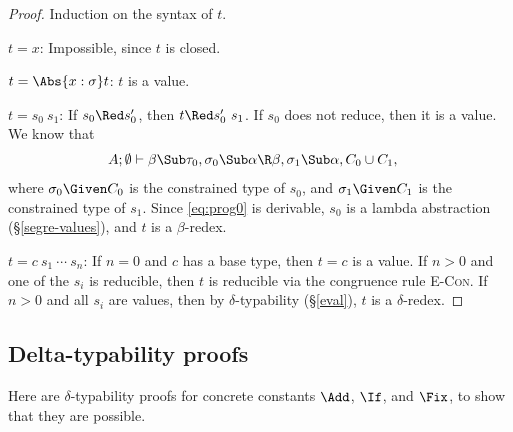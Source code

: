 \documentclass{amsart}
\theoremstyle{definition}
\begin{document}
\begin{proof}
Induction on the syntax of $t$.

\Case$t=x$: Impossible, since $t$ is closed.

\Case$t=\Abs{x:\sigma}t$: $t$ is a value.

\Case$t=s_0~s_1$: If $s_0\Red s_0'$, then $t\Red s_0'~s_1$. If
$s_0$ does not reduce, then it is a value. We know that
\begin{align}
A;\emptyset&\vdash \beta\Sub\tau_0,
\sigma_0\Sub\alpha\R\beta,\sigma_1\Sub\alpha,C_0\cup C_1,
\label{eq:prog0}
\end{align}
where $\sigma_0\Given C_0$ is the constrained type of $s_0$, and
$\sigma_1\Given C_1$ is the constrained type of $s_1$. Since
\eqref{eq:prog0} is derivable, $s_0$ is a lambda abstraction
(\S\ref{segre-values}), and $t$ is a $\beta$-redex.

\Case$t=c~s_1~\cdots~s_n$: If $n=0$ and $c$ has a base type, then
$t=c$ is a value. If $n>0$ and one of the $s_i$ is reducible,
then $t$ is reducible via the congruence rule \textsc{E-Con}. If
$n>0$ and all $s_i$ are values, then by $\delta$-typability
(\S\ref{eval}), $t$ is a $\delta$-redex.
\end{proof}

\subsection{Delta-typability proofs}
Here are $\delta$-typability proofs for concrete constants
$\Add$, $\If$, and $\Fix$, to show that they are possible.


\end{document}
